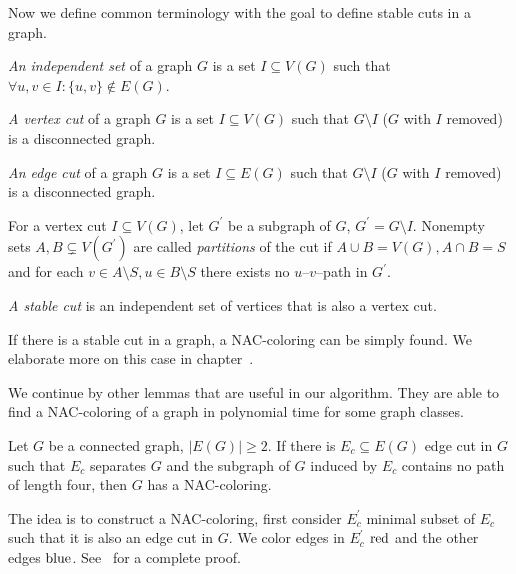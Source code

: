 Now we define common terminology with the goal to define stable cuts in a graph.
%
\begin{definition}
	\emph{An independent set} of a graph \( G \) is a set \( I \subseteq V(G) \) such that
	\( \forall u, v \in I : \{u, v\} \not\in E(G) \).
\end{definition}
%
\begin{definition}
	\emph{A vertex cut} of a graph \( G \) is a set \( I \subseteq V(G) \) such that
	\( G \setminus I \) (\( G \) with \( I \) removed) is a disconnected graph.
\end{definition}
%
\begin{definition}
	\emph{An edge cut} of a graph \( G \) is a set \( I \subseteq E(G) \) such that
	\( G \setminus I \) (\( G \) with \( I \) removed) is a disconnected graph.
\end{definition}
%
\begin{definition}
	For a vertex cut \( I \subseteq V(G) \),
	let \( G^\prime \) be a subgraph of \( G \), \( G^\prime = G \setminus I \).
	Nonempty sets \( A, B \subsetneq V(G^\prime) \) are called \emph{partitions} of the cut
	if \( A \cup B = V(G), A \cap B = S \) and for each \( v \in A \setminus S, u \in B \setminus S \)
	there exists no \( u \)--\( v \)--path in \( G^\prime \).
\end{definition}
%
\begin{definition}
	\emph{A stable cut} is an independent set of vertices that is also a vertex cut.
\end{definition}
%
If there is a stable cut in a graph, a NAC-coloring can be simply found.
We elaborate more on this case in chapter~.

We continue by other lemmas that are useful in our algorithm.
They are able to find a NAC-coloring of a graph in polynomial time for some graph classes.
%
\begin{lemma}
	Let \( G \) be a connected graph, \( |E(G)| \ge 2 \). If there is \( E_c \subseteq E(G) \)
	edge cut in \( G \) such that \( E_c \) separates \( G \) and the subgraph of \( G \)
	induced by \( E_c \) contains no path of length four, then \( G \) has a NAC-coloring.
\end{lemma}
%
The idea is to construct a NAC-coloring, first consider \( E_c^\prime \) minimal subset of \( E_c \)
such that it is also an edge cut in \( G \).
We color edges in \( E_c^\prime \) \( \text{red} \) and the other edges \( \text{blue} \).
See~\cite{legersky_original} for a complete proof.

